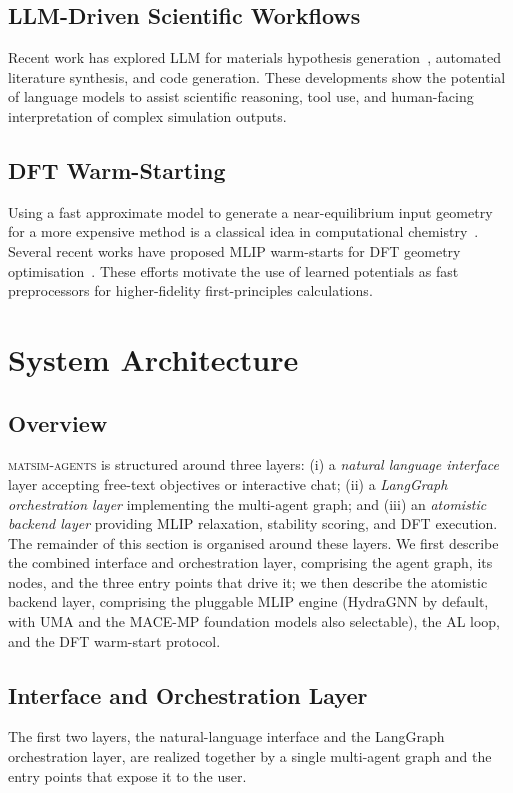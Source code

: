 \documentclass[conference]{IEEEtran}
\def\acs#1{#1}%
\def\acp#1{#1}%
\begin{document}
\subsection{LLM-Driven Scientific Workflows}
Recent work has explored \acp{LLM} for materials hypothesis generation~\cite{
merchant2023,xie2023,sprueill2023}, automated literature synthesis, and code
generation. These developments show the potential of language models to assist
scientific reasoning, tool use, and human-facing interpretation of complex
simulation outputs.

\subsection{DFT Warm-Starting}
Using a fast approximate model to generate a near-equilibrium input geometry
for a more expensive method is a classical idea in computational
chemistry~\cite{lejaeghere2016}. Several recent works have proposed \acs{MLIP}
warm-starts for \acs{DFT} geometry optimisation~\cite{schreiner2022,merchant2023}.
These efforts motivate the use of learned potentials as fast preprocessors for
higher-fidelity first-principles calculations.

\section{System Architecture}
\label{sec:architecture}

\subsection{Overview}
\textsc{matsim-agents} is structured around three layers:
(i) a \emph{natural language interface} layer accepting free-text objectives
or interactive chat; (ii) a \emph{LangGraph orchestration layer} implementing
the multi-agent graph; and (iii) an \emph{atomistic backend layer} providing
\acs{MLIP} relaxation, stability scoring, and \acs{DFT} execution. The remainder
of this section is organised around these layers. We first describe the
combined interface and orchestration layer, comprising the agent graph, its
nodes, and the three entry points that drive it; we then describe the atomistic
backend layer, comprising the pluggable \acs{MLIP} engine (HydraGNN by default,
with UMA and the MACE-MP foundation models also selectable), the \acs{AL}
loop, and the \acs{DFT} warm-start protocol.

\subsection{Interface and Orchestration Layer}
The first two layers, the natural-language interface
and the LangGraph orchestration layer, are realized together by a single
multi-agent graph and the entry points that expose it to the user.
\end{document}
